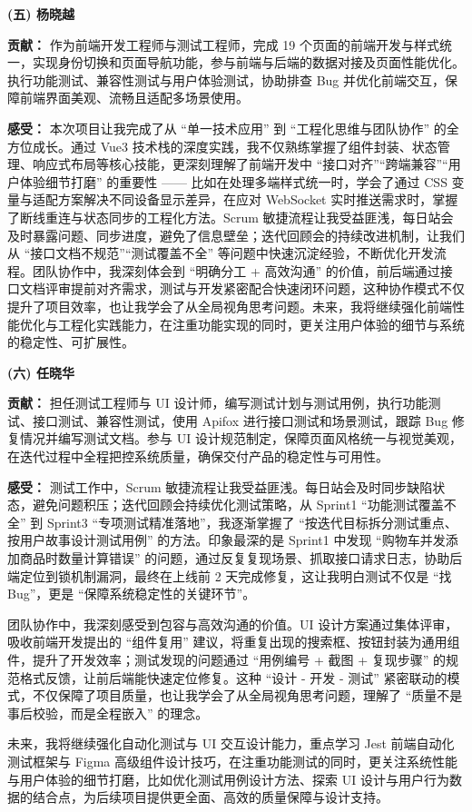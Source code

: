 \textbf{}

\noindent \textbf{(五) 杨晓越}

\textbf{贡献：} 作为前端开发工程师与测试工程师，完成 19 个页面的前端开发与样式统一，实现身份切换和页面导航功能，参与前端与后端的数据对接及页面性能优化。执行功能测试、兼容性测试与用户体验测试，协助排查 Bug 并优化前端交互，保障前端界面美观、流畅且适配多场景使用。

\textbf{感受：} 本次项目让我完成了从 “单一技术应用” 到 “工程化思维与团队协作” 的全方位成长。通过 Vue3 技术栈的深度实践，我不仅熟练掌握了组件封装、状态管理、响应式布局等核心技能，更深刻理解了前端开发中 “接口对齐”“跨端兼容”“用户体验细节打磨” 的重要性 —— 比如在处理多端样式统一时，学会了通过 CSS 变量与适配方案解决不同设备显示差异，在应对 WebSocket 实时推送需求时，掌握了断线重连与状态同步的工程化方法。Scrum 敏捷流程让我受益匪浅，每日站会及时暴露问题、同步进度，避免了信息壁垒；迭代回顾会的持续改进机制，让我们从 “接口文档不规范”“测试覆盖不全” 等问题中快速沉淀经验，不断优化开发流程。团队协作中，我深刻体会到 “明确分工 + 高效沟通” 的价值，前后端通过接口文档评审提前对齐需求，测试与开发紧密配合快速闭环问题，这种协作模式不仅提升了项目效率，也让我学会了从全局视角思考问题。未来，我将继续强化前端性能优化与工程化实践能力，在注重功能实现的同时，更关注用户体验的细节与系统的稳定性、可扩展性。

\textbf{}

\noindent \textbf{(六) 任晓华}

\textbf{贡献：} 担任测试工程师与 UI 设计师，编写测试计划与测试用例，执行功能测试、接口测试、兼容性测试，使用 Apifox 进行接口测试和场景测试，跟踪 Bug 修复情况并编写测试文档。参与 UI 设计规范制定，保障页面风格统一与视觉美观，在迭代过程中全程把控系统质量，确保交付产品的稳定性与可用性。

\textbf{感受：} 测试工作中，Scrum 敏捷流程让我受益匪浅。每日站会及时同步缺陷状态，避免问题积压；迭代回顾会持续优化测试策略，从 Sprint1 “功能测试覆盖不全” 到 Sprint3 “专项测试精准落地”，我逐渐掌握了 “按迭代目标拆分测试重点、按用户故事设计测试用例” 的方法。印象最深的是 Sprint1 中发现 “购物车并发添加商品时数量计算错误” 的问题，通过反复复现场景、抓取接口请求日志，协助后端定位到锁机制漏洞，最终在上线前 2 天完成修复，这让我明白测试不仅是 “找 Bug”，更是 “保障系统稳定性的关键环节”。

团队协作中，我深刻感受到包容与高效沟通的价值。UI 设计方案通过集体评审，吸收前端开发提出的 “组件复用” 建议，将重复出现的搜索框、按钮封装为通用组件，提升了开发效率；测试发现的问题通过 “用例编号 + 截图 + 复现步骤” 的规范格式反馈，让前后端能快速定位修复。这种 “设计 - 开发 - 测试” 紧密联动的模式，不仅保障了项目质量，也让我学会了从全局视角思考问题，理解了 “质量不是事后校验，而是全程嵌入” 的理念。

未来，我将继续强化自动化测试与 UI 交互设计能力，重点学习 Jest 前端自动化测试框架与 Figma 高级组件设计技巧，在注重功能测试的同时，更关注系统性能与用户体验的细节打磨，比如优化测试用例设计方法、探索 UI 设计与用户行为数据的结合点，为后续项目提供更全面、高效的质量保障与设计支持。

